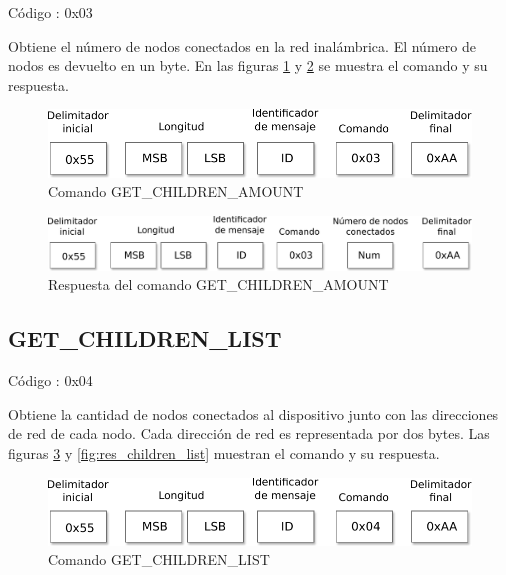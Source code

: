 Código : 0x03

Obtiene el número de nodos conectados en la red inalámbrica. El número de nodos es devuelto en un byte. En las figuras \ref{fig:cmd_children_amount} y \ref{fig:res_children_amount} se muestra el comando y su respuesta. 

\begin{figure}[h!]
	\centering
	\includegraphics[scale=0.7]{capitulo_3_imgs/cmd_children_amount.pdf}
	\caption{Comando GET\_CHILDREN\_AMOUNT}
	\label{fig:cmd_children_amount}
\end{figure}

\begin{figure}[h!]
	\centering
	\includegraphics[scale=0.7]{capitulo_3_imgs/res_children_amount.pdf}
	\caption{Respuesta del comando GET\_CHILDREN\_AMOUNT}
	\label{fig:res_children_amount}
\end{figure}


\subsection{GET\_CHILDREN\_LIST}

Código : 0x04

Obtiene la cantidad de nodos conectados al dispositivo junto con las direcciones de red de cada nodo. Cada dirección de red es representada por dos bytes. Las figuras \ref{fig:cmd_children_list} y \ref{fig:res_children_list} muestran el comando y su respuesta. 

\begin{figure}[h]
	\centering 
	\includegraphics[scale=0.7]{capitulo_3_imgs/cmd_children_list.pdf}
	\caption{Comando GET\_CHILDREN\_LIST}
	\label{fig:cmd_children_list}
\end{figure}

